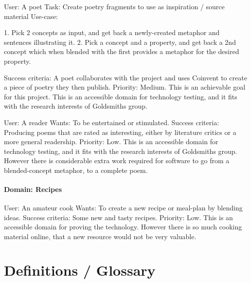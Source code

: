 \documentclass[10pt]{article}
\begin{document}
\begin{appendices}
User: A poet   
Task: Create poetry fragments to use as inspiration / source material   
Use-case: 

1. Pick 2 concepts as input, and get back a newly-created metaphor and sentences illustrating it.   
2. Pick a concept and a property, and get back a 2nd concept which when blended with the first provides a metaphor for the desired property. 

Success criteria: A poet collaborates with the project and uses Coinvent to create a piece of poetry they then publish.  
Priority: Medium. This is an achievable goal for this project. This is an accessible domain for technology testing, and it fits with the research interests of Goldsmiths group.

User: A reader   
Wants: To be entertained or stimulated.   
Success criteria: Producing poems that are rated as interesting, either by literature critics or a more general readership.    
Priority: Low. This is an accessible domain for technology testing, and it fits with the research interests of Goldsmiths group. However there is considerable extra work required for software to go from a blended-concept metaphor, to a complete poem.

\paragraph{Domain: Recipes}

User: An amateur cook   
Wants: To create a new recipe or meal-plan by blending ideas.   
Success criteria: Some new and tasty recipes.   
Priority: Low. This is an accessible domain for proving the technology. However there is so much cooking material online, that a new resource would not be very valuable.   


	
\section{Definitions / Glossary}



\end{appendices}
\end{document}
